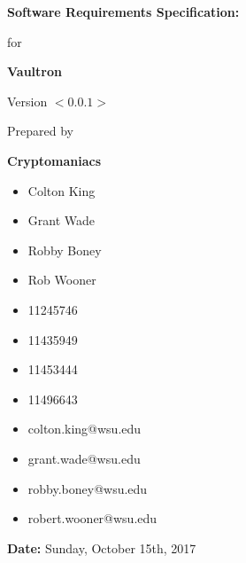 \documentclass{report}
\begin{document}

{\Huge \textbf{Software Requirements Specification:}}
\vspace{5mm}
\begin{flushright}

    {\huge for}
    \vspace{20mm}

    \textbf{\Huge Vaultron}
    \vspace{20mm}

    {\huge Version $<0.0.1>$}
    \vspace{20mm}

    {\huge Prepared by}
    \vspace{20mm}

    \textbf{\huge Cryptomaniacs}
    \vspace{20mm}
\end{flushright}

\begin{multicols}{3}
    \begin{itemize}
        \item[] {\Large Colton King}
        \item[] {\Large Grant Wade}
        \item[] {\Large Robby Boney}
        \item[] {\Large Rob Wooner}
    \end{itemize}

    \begin{itemize}
        \item[] {\Large 11245746}
        \item[] {\Large 11435949}
        \item[] {\Large 11453444}
        \item[] {\Large 11496643}
    \end{itemize}

    \begin{itemize}
        \item[] {\Large colton.king@wsu.edu}
        \item[] {\Large grant.wade@wsu.edu}
        \item[] {\Large robby.boney@wsu.edu}
        \item[] {\Large robert.wooner@wsu.edu}
    \end{itemize}
\end{multicols}

\vfill

\begin{flushright}
    \vspace{20mm}
    {\Large \textbf{Date:} Sunday, October 15th, 2017}
\end{flushright}
\end{document}
